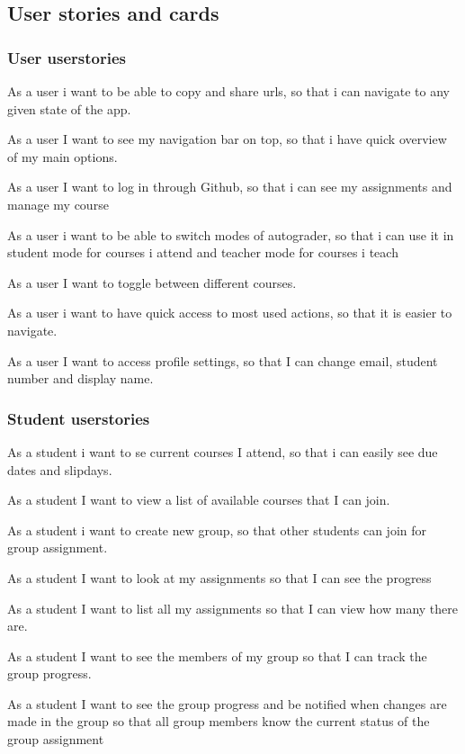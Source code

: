 \begin{appendices}
\chapter{User stories and cards}\label{app:userstories}

\subsection*{User userstories}
\begin{itemize*}
\item As a user i want to be able to copy and share urls, so that i can navigate to any given state of the app.
\item As a user I want to see my navigation bar on top, so that i have quick overview of my main options.
\item As a user I want to log in through Github, so that i can see my assignments and manage my course
\item As a user i want to be able to switch modes of autograder, so that i can use it in student mode for courses i attend and teacher mode for courses i teach
\item As a user I want to toggle between different courses.
\item As a user i want to have quick access to most used actions, so that it is easier to navigate.
\item As a user I want to access profile settings, so that I can change email, student number and display name.

\subsection*{Student userstories}
\item As a student i want to se current courses I attend, so that i can easily see due dates and slipdays.
\item As a student I want to view a list of available courses that I can join.
\item As a student i want to create new group, so that other students can join for group assignment.
\item As a student I want to look at my assignments so that I can see the progress
\item As a student I want to list all my assignments so that I can view how many there are.
\item As a student I want to see the members of my group so that I can track the group progress.
\item As a student I want to see the group progress and be notified when changes are made in the group so that all group members know the current status of the group assignment 


\end{itemize*}
\end{appendices}
